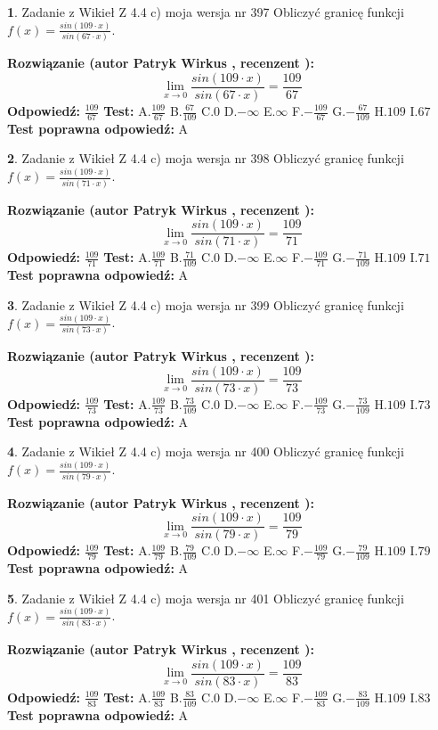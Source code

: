 \documentclass[12pt, a4paper]{article}
\theoremstyle{definition} %
\newtheorem{zad}{}
\newcommand{\zadStart}[1]{\begin{zad}#1\newline}
\newcommand{\zadStop}{\end{zad}}
\newcommand{\rozwStart}[2]{\noindent \textbf{Rozwiązanie (autor #1 , recenzent #2): }\newline}
\newcommand{\rozwStop}{\newline}
\newcommand{\odpStart}{\noindent \textbf{Odpowiedź:}\newline}
\newcommand{\odpStop}{\newline}
\newcommand{\testStart}{\noindent \textbf{Test:}\newline}
\newcommand{\testStop}{\newline}
\newcommand{\kluczStart}{\noindent \textbf{Test poprawna odpowiedź:}\newline}
\newcommand{\kluczStop}{\newline}
\begin{document}
\zadStart{Zadanie z Wikieł Z 4.4 c) moja wersja nr 397}
Obliczyć granicę funkcji $f(x)=\frac{sin(109\cdot x)}{sin(67\cdot x)}$.
\zadStop
\rozwStart{Patryk Wirkus}{}
$$\lim\limits_{x\to 0}\frac{sin(109\cdot x)}{sin(67\cdot x)}=
\frac{109}{67}$$
\rozwStop
\odpStart
$\frac{109}{67}$
\odpStop
\testStart
A.$\frac{109}{67}$
B.$\frac{67}{109}$
C.$0$
D.$-\infty$
E.$\infty$
F.$-\frac{109}{67}$
G.$-\frac{67}{109}$
H.$109$
I.$67$
\testStop
\kluczStart
A
\kluczStop



\zadStart{Zadanie z Wikieł Z 4.4 c) moja wersja nr 398}
Obliczyć granicę funkcji $f(x)=\frac{sin(109\cdot x)}{sin(71\cdot x)}$.
\zadStop
\rozwStart{Patryk Wirkus}{}
$$\lim\limits_{x\to 0}\frac{sin(109\cdot x)}{sin(71\cdot x)}=
\frac{109}{71}$$
\rozwStop
\odpStart
$\frac{109}{71}$
\odpStop
\testStart
A.$\frac{109}{71}$
B.$\frac{71}{109}$
C.$0$
D.$-\infty$
E.$\infty$
F.$-\frac{109}{71}$
G.$-\frac{71}{109}$
H.$109$
I.$71$
\testStop
\kluczStart
A
\kluczStop



\zadStart{Zadanie z Wikieł Z 4.4 c) moja wersja nr 399}
Obliczyć granicę funkcji $f(x)=\frac{sin(109\cdot x)}{sin(73\cdot x)}$.
\zadStop
\rozwStart{Patryk Wirkus}{}
$$\lim\limits_{x\to 0}\frac{sin(109\cdot x)}{sin(73\cdot x)}=
\frac{109}{73}$$
\rozwStop
\odpStart
$\frac{109}{73}$
\odpStop
\testStart
A.$\frac{109}{73}$
B.$\frac{73}{109}$
C.$0$
D.$-\infty$
E.$\infty$
F.$-\frac{109}{73}$
G.$-\frac{73}{109}$
H.$109$
I.$73$
\testStop
\kluczStart
A
\kluczStop



\zadStart{Zadanie z Wikieł Z 4.4 c) moja wersja nr 400}
Obliczyć granicę funkcji $f(x)=\frac{sin(109\cdot x)}{sin(79\cdot x)}$.
\zadStop
\rozwStart{Patryk Wirkus}{}
$$\lim\limits_{x\to 0}\frac{sin(109\cdot x)}{sin(79\cdot x)}=
\frac{109}{79}$$
\rozwStop
\odpStart
$\frac{109}{79}$
\odpStop
\testStart
A.$\frac{109}{79}$
B.$\frac{79}{109}$
C.$0$
D.$-\infty$
E.$\infty$
F.$-\frac{109}{79}$
G.$-\frac{79}{109}$
H.$109$
I.$79$
\testStop
\kluczStart
A
\kluczStop



\zadStart{Zadanie z Wikieł Z 4.4 c) moja wersja nr 401}
Obliczyć granicę funkcji $f(x)=\frac{sin(109\cdot x)}{sin(83\cdot x)}$.
\zadStop
\rozwStart{Patryk Wirkus}{}
$$\lim\limits_{x\to 0}\frac{sin(109\cdot x)}{sin(83\cdot x)}=
\frac{109}{83}$$
\rozwStop
\odpStart
$\frac{109}{83}$
\odpStop
\testStart
A.$\frac{109}{83}$
B.$\frac{83}{109}$
C.$0$
D.$-\infty$
E.$\infty$
F.$-\frac{109}{83}$
G.$-\frac{83}{109}$
H.$109$
I.$83$
\testStop
\kluczStart
A
\kluczStop
\end{document}
